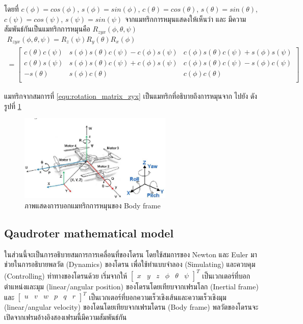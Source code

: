 \documentclass{classes/fiboReport}
\begin{document}
โดยที่ $c(\phi) = cos(\phi)$, $s(\phi) = sin(\phi)$, $c(\theta) = cos(\theta)$, $s(\theta) = sin(\theta)$, $c(\psi) = cos(\psi)$, $s(\psi) = sin(\psi)$
จากแมทริกการหมุนแสดงให้เห็นว่า  และ 
มีความสัมพันธ์กันเป็นแมทริกการหมุนคือ $R_{zyx}(\phi,\theta,\psi)$
\begin{equation}
	\begin{array}{c}
		{R_{zyx}(\phi,\theta,\psi) = R_{z}(\psi)R_{y}(\theta)R_{x}(\phi)}\\
		{= \begin{bmatrix}
		c(\theta)c(\psi) & s(\phi)s(\theta)c(\psi)-c(\phi)s(\psi) & c(\phi)s(\theta)c(\psi)+s(\phi)s(\psi) \\
		c(\theta)s(\psi) & s(\phi)s(\theta)c(\psi)+c(\phi)s(\psi) & c(\phi)s(\theta)c(\psi)-s(\phi)c(\psi) \\
		-s(\theta)       & s(\phi)c(\theta)                       & c(\phi)c(\theta)                       \\
		\end{bmatrix}}
		\label{equ:rotation_matrix_zyx}
	\end{array}
\end{equation}

แมทริกจากสมการที่ \ref{equ:rotation_matrix_zyx} เป็นแมทริกที่อธิบายถึงการหมุนจาก  ไปยัง 
ดังรูปที่ \ref{fig:quadroter_eulerangles}
\begin{figure}[htbp]
	\centering
	\includegraphics[width=0.65\textwidth]{images/Quadcopter_EulerAngles.png}
	\caption{ภาพแสดงการบอกแมทริกการหมุนของ Body frame}
	\label{fig:quadroter_eulerangles}
\end{figure}
\clearpage
\subsection{Qaudroter mathematical model}
ในส่วนนี้จะเป็นการอธิบายสมการการเคลื่อนที่ของโดรน โดยใช้สมการของ Newton และ Euler มาช่วยในการอธิบายพลวัต (Dynamics) ของโดรน
เพื่อใช้ทำแบบจำลอง (Simulating) และควบคุม (Controlling) ท่าทางของโดรนด้วย
เริ่มจากให้ $[\begin{matrix}x & y & z & \phi & \theta & \psi \end{matrix}]^T$ เป็นเวกเตอร์ที่บอกตำแหน่งและมุม (linear/angular position)
ของโดรนโดยเทียบจากเฟรมโลก (Inertial frame) และ $[\begin{matrix}u & v & w & p & q & r\end{matrix}]^T$ เป็นเวกเตอร์ที่บอกความเร็วเชิงเส้นและความเร็วเชิงมุม
(linear/angular velocity) ของโดนโดยเทียบจากเฟรมโดรน (Body frame) พลวัตของโดรนจะเปิดจากเฟรมอ้างอิงสองเฟรมนี้มีความสัมพันธ์กัน
\end{document}
